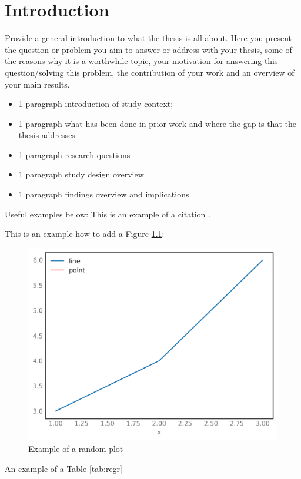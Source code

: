 \chapter{Introduction}
\label{sec:Introduction}

Provide a general introduction to what the thesis is all about. Here you present the question or problem you aim to answer or address with your thesis, some of the reasons why it is a worthwhile topic, your motivation for answering this question/solving this problem, the contribution of your work and an overview of your main results. 

\begin{itemize}
    \item 1 paragraph introduction of study context;
    \item 1 paragraph what has been done in prior work and where the gap is that the thesis addresses
    \item 1 paragraph research questions
    \item 1 paragraph study design overview
    \item 1 paragraph findings overview and implications
\end{itemize}

Useful examples below:
This is an example of a citation \cite{einstein}.

This is an example how to add a Figure \ref{fig:plot}:
\begin{figure}[htb]
\centerline{\includegraphics[width=13cm,keepaspectratio,]{images/plot-example.png}}
\caption{Example of a random plot}
\label{fig:plot}
\end{figure}

An example of a Table \ref{tab:regr}
